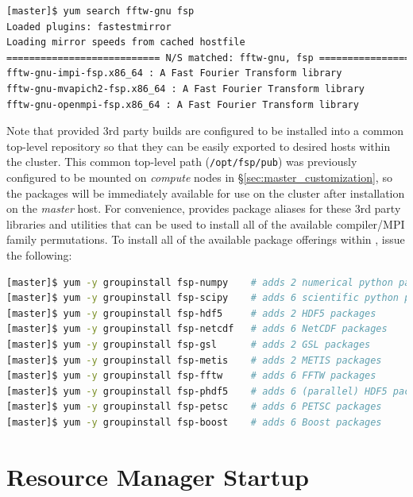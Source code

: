 \documentclass[letterpaper]{article}
\begin{document}
\begin{lstlisting}[language=bash]
[master]$ yum search fftw-gnu fsp
Loaded plugins: fastestmirror
Loading mirror speeds from cached hostfile
=========================== N/S matched: fftw-gnu, fsp ===========================
fftw-gnu-impi-fsp.x86_64 : A Fast Fourier Transform library
fftw-gnu-mvapich2-fsp.x86_64 : A Fast Fourier Transform library
fftw-gnu-openmpi-fsp.x86_64 : A Fast Fourier Transform library
\end{lstlisting}

Note that \FSP{} provided 3rd party builds are configured to be installed
into a common top-level repository so that they can be easily exported to
desired hosts within the cluster. This common top-level path
(\texttt{/opt/fsp/pub}) was previously configured to be mounted on {\em
  compute} nodes in \S\ref{sec:master_customization}, so the packages will be
immediately available for use on the cluster after installation on the {\em
  master} host.  For convenience, \FSP{} provides package aliases for these 3rd
party libraries and utilities that can be used to install all of the available
compiler/MPI family permutations. To install all of the available package
offerings within \FSP{}, issue the following:

\begin{lstlisting}[language=bash,keywords={},upquote=true,keepspaces]
[master]$ yum -y groupinstall fsp-numpy    # adds 2 numerical python packages
[master]$ yum -y groupinstall fsp-scipy    # adds 6 scientific python packages
[master]$ yum -y groupinstall fsp-hdf5     # adds 2 HDF5 packages
[master]$ yum -y groupinstall fsp-netcdf   # adds 6 NetCDF packages
[master]$ yum -y groupinstall fsp-gsl      # adds 2 GSL packages
[master]$ yum -y groupinstall fsp-metis    # adds 2 METIS packages
[master]$ yum -y groupinstall fsp-fftw     # adds 6 FFTW packages
[master]$ yum -y groupinstall fsp-phdf5    # adds 6 (parallel) HDF5 packages
[master]$ yum -y groupinstall fsp-petsc    # adds 6 PETSC packages
[master]$ yum -y groupinstall fsp-boost    # adds 6 Boost packages
\end{lstlisting}


\section{Resource Manager Startup}
\end{document}
